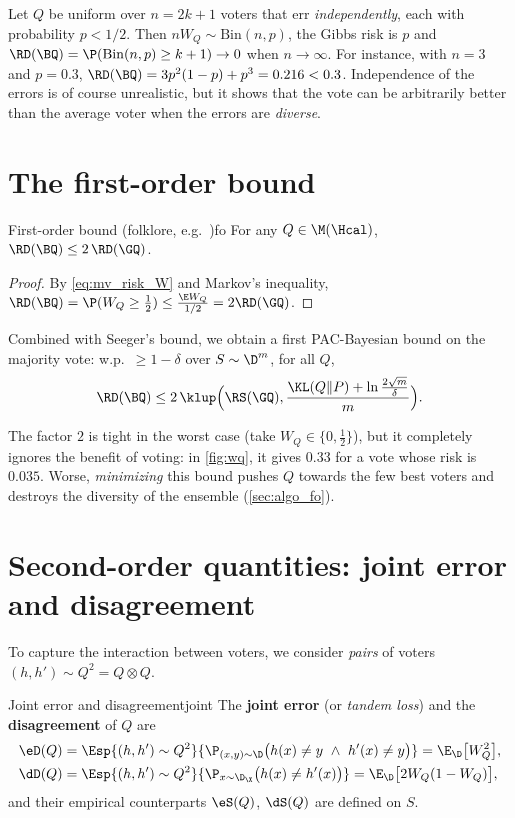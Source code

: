 \begin{example}
Let $Q$ be uniform over $n=2k+1$ voters that err \emph{independently}, each with
probability $p<1/2$. Then $nW_Q\sim\mathrm{Bin}(n,p)$, the Gibbs risk is $p$ and
$\RD(\BQ)=\P(\mathrm{Bin}(n,p)\geq k+1)\to0$ when $n\to\infty$. For instance, with
$n=3$ and $p=0.3$, $\RD(\BQ)=3p^2(1-p)+p^3=0.216<0.3$. Independence of the errors
is of course unrealistic, but it shows that the vote can be arbitrarily better
than the average voter when the errors are \emph{diverse}.
\end{example}

\section{The first-order bound}

\begin{proposition}{First-order bound (folklore, e.g.\ \citealp{langford2002pac})}{fo}
For any $Q\in\M(\Hcal)$, $\RD(\BQ)\leq2\,\RD(\GQ)$.
\end{proposition}
\begin{proof}
By \eqref{eq:mv_risk_W} and Markov's inequality,
$\RD(\BQ)=\P(W_Q\geq\frac12)\leq\frac{\E W_Q}{1/2}=2\RD(\GQ)$.
\end{proof}

Combined with Seeger's bound, we obtain a first PAC-Bayesian bound on the
majority vote: w.p.\ $\geq1-\delta$ over $S\sim\D^m$, for all $Q$,
\begin{equation}\label{eq:fo_pb}
\RD(\BQ)\leq2\,\klup\Big(\RS(\GQ),\frac{\KL(Q\|P)+\ln\frac{2\sqrt m}{\delta}}{m}\Big).
\end{equation}

The factor $2$ is tight in the worst case (take $W_Q\in\{0,\frac12\}$), but it
completely ignores the benefit of voting: in \cref{fig:wq}, it gives
$0.33$ for a vote whose risk is $0.035$. Worse, \emph{minimizing} this bound
pushes $Q$ towards the few best voters and destroys the diversity of the
ensemble (\cref{sec:algo_fo}).

\section{Second-order quantities: joint error and disagreement}

To capture the interaction between voters, we consider \emph{pairs} of voters
$(h,h')\sim Q^2=Q\otimes Q$.

\begin{definition}{Joint error and disagreement}{joint}
The \textbf{joint error} (or \emph{tandem loss}) and the \textbf{disagreement} of $Q$ are
\begin{align*}
\eD(Q)&=\Esp{(h,h')\sim Q^2}{\P_{(x,y)\sim\D}\big(h(x)\neq y\ \wedge\ h'(x)\neq y\big)}=\E_\D\big[W_Q^2\big],\\
\dD(Q)&=\Esp{(h,h')\sim Q^2}{\P_{x\sim\D_\X}\big(h(x)\neq h'(x)\big)}=\E_\D\big[2W_Q(1-W_Q)\big],
\end{align*}
and their empirical counterparts $\eS(Q)$, $\dS(Q)$ are defined on $S$.
\end{definition}

